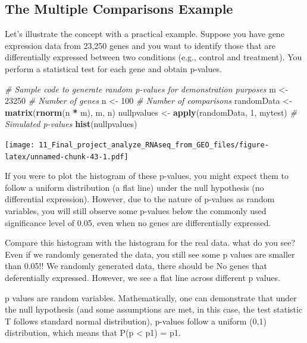\documentclass[
]{book}
\newenvironment{Shaded}{\begin{snugshade}}{\end{snugshade}}
\newcommand{\CommentTok}[1]{\textcolor[rgb]{0.56,0.35,0.01}{\textit{#1}}}
\newcommand{\DecValTok}[1]{\textcolor[rgb]{0.00,0.00,0.81}{#1}}
\newcommand{\FunctionTok}[1]{\textcolor[rgb]{0.13,0.29,0.53}{\textbf{#1}}}
\newcommand{\NormalTok}[1]{#1}
\newcommand{\OtherTok}[1]{\textcolor[rgb]{0.56,0.35,0.01}{#1}}
\newcommand{\SpecialCharTok}[1]{\textcolor[rgb]{0.81,0.36,0.00}{\textbf{#1}}}
\begin{document}
\hypertarget{the-multiple-comparisons-example}{%
\subsection{The Multiple Comparisons Example}\label{the-multiple-comparisons-example}}

Let's illustrate the concept with a practical example. Suppose you have gene expression data from 23,250 genes and you want to identify those that are differentially expressed between two conditions (e.g., control and treatment). You perform a statistical test for each gene and obtain p-values.

\begin{Shaded}
\begin{Highlighting}[]
\CommentTok{\# Sample code to generate random p{-}values for demonstration purposes}
\NormalTok{m }\OtherTok{\textless{}{-}} \DecValTok{23250}  \CommentTok{\# Number of genes}
\NormalTok{n }\OtherTok{\textless{}{-}} \DecValTok{100}    \CommentTok{\# Number of comparisons}
\NormalTok{randomData }\OtherTok{\textless{}{-}} \FunctionTok{matrix}\NormalTok{(}\FunctionTok{rnorm}\NormalTok{(n }\SpecialCharTok{*}\NormalTok{ m), m, n)}
\NormalTok{nullpvalues }\OtherTok{\textless{}{-}} \FunctionTok{apply}\NormalTok{(randomData, }\DecValTok{1}\NormalTok{, mytest)  }\CommentTok{\# Simulated p{-}values}
\FunctionTok{hist}\NormalTok{(nullpvalues)}
\end{Highlighting}
\end{Shaded}

\texttt{[image: 11\_Final\_project\_analyze\_RNAseq\_from\_GEO\_files/figure-latex/unnamed-chunk-43-1.pdf]}

If you were to plot the histogram of these p-values, you might expect them to follow a uniform distribution (a flat line) under the null hypothesis (no differential expression). However, due to the nature of p-values as random variables, you will still observe some p-values below the commonly used significance level of 0.05, even when no genes are differentially expressed.

Compare this histogram with the histogram for the real data. what do you see? Even if we randomly generated the data, you still see some p values are smaller than 0.05!! We randomly generated data, there should be No genes that deferentially expressed. However, we see a flat line across different p values.

p values are random variables. Mathematically, one can demonstrate that under the null hypothesis (and some assumptions are met, in this case, the test statistic T follows standard normal distribution), p-values follow a uniform (0,1) distribution, which means that P(p \textless{} p1) = p1.
\end{document}
